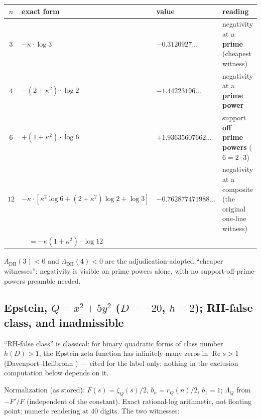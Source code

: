 \documentclass[11pt]{article}
\theoremstyle{plain}
\theoremstyle{definition}
\theoremstyle{remark}
\begin{document}
\begin{center}
\small
\begin{tabular}{@{}c l l >{\raggedright\arraybackslash}p{4.1cm}@{}}
\toprule
$n$ & exact form & value & reading \\
\midrule
$3$ & $-\kappa \cdot \log 3$ & $\mathbf{-0.3120927\ldots}$ &
negativity at a \textbf{prime} (cheapest witness) \\
\addlinespace
$4$ & $-(2 + \kappa^2) \cdot \log 2$ & $\mathbf{-1.44223196\ldots}$ &
negativity at a \textbf{prime power} \\
\addlinespace
$6$ & $+(1 + \kappa^2) \cdot \log 6$ & $\mathbf{+1.93635607662\ldots}$ &
support \textbf{off prime powers} ($6 = 2 \cdot 3$) \\
\addlinespace
$12$ & $-\kappa \cdot [\kappa^2 \log 6 + (2 + \kappa^2) \log 2 + \log 3]$ &
$\mathbf{-0.762877471988\ldots}$ &
negativity at a composite (the original one-line witness) \\
& $\quad = -\kappa (1 + \kappa^2) \cdot \log 12$ & & \\
\bottomrule
\end{tabular}
\end{center}

\medskip
$\Lambda_{\mathrm{DH}}(3) < 0$ and $\Lambda_{\mathrm{DH}}(4) < 0$ are the
adjudication-adopted ``cheaper witnesses'': negativity is visible on prime
powers alone, with no support-off-prime-powers preamble needed.

\subsection{Epstein, \texorpdfstring{$Q = x^2 + 5y^2$ ($D = -20$, $h = 2$)}{Q
= x\^{}2 + 5y\^{}2 (D = -20, h = 2)}; RH-false class, and
inadmissible}\label{sec:epstein}

``RH-false class'' is classical: for binary quadratic forms of class number
$h(D) > 1$, the Epstein zeta function has infinitely many zeros in
$\operatorname{Re} s > 1$ (Davenport--Heilbronn \cite{DH1936}) --- cited for
the label only; nothing in the exclusion computation below depends on it.

Normalization (as stored): $F(s) = \zeta_Q(s)/2$, $b_n = r_Q(n)/2$,
$b_1 = 1$; $\Lambda_Q$ from $-F'/F$ (independent of the constant). Exact
rational-log arithmetic, not floating point; numeric rendering at $40$ digits.
The two witnesses:
\end{document}
